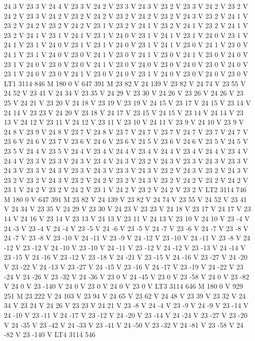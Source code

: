 24 3 V 23 3 V 24 4 V 23 3 V 24 2 V 23 3 V 24 3 V 23 2 V 23 3 V 24 2
V 23 2 V 24 2 V 23 3 V 24 2 V 23 2 V 24 2 V 23 2 V 24 2 V 23 2 V 24
3 V 23 2 V 24 1 V 23 2 V 24 2 V 23 2 V 24 2 V 23 1 V 23 2 V 24 1 V
23 2 V 24 1 V 23 2 V 24 1 V 23 2 V 24 1 V 23 1 V 24 1 V 23 1 V 24 0
V 23 1 V 24 1 V 23 1 V 24 0 V 23 1 V 24 1 V 23 1 V 24 0 V 23 1 V 23
1 V 24 0 V 23 1 V 24 1 V 23 0 V 24 1 V 23 0 V 24 1 V 23 1 V 24 0 V
23 0 V 24 1 V 23 0 V 24 1 V 23 0 V 24 1 V 23 0 V 24 0 V 23 1 V 24 0
V 23 0 V 23 0 V 24 1 V 23 0 V 24 0 V 23 0 V 24 0 V 23 0 V 24 0 V 23
1 V 24 0 V 23 0 V 24 1 V 23 0 V 24 0 V 23 1 V 24 0 V 23 0 V 24 0 V
23 0 V LT1 3114 846 M 180 0 V 647 391 M 23 82 V 24 139 V 23 82 V 24
74 V 23 55 V 24 52 V 23 41 V 24 34 V 23 35 V 24 29 V 23 30 V 24 26
V 23 26 V 24 26 V 23 25 V 24 21 V 23 20 V 24 18 V 23 19 V 23 19 V 24
15 V 23 17 V 24 15 V 23 14 V 24 14 V 23 23 V 24 20 V 23 18 V 24 17
V 23 15 V 24 15 V 23 14 V 24 14 V 23 13 V 24 12 V 23 11 V 24 12 V 23
11 V 23 10 V 24 11 V 23 9 V 24 10 V 23 9 V 24 8 V 23 9 V 24 8 V 23
7 V 24 8 V 23 7 V 24 7 V 23 7 V 24 7 V 23 7 V 24 7 V 23 6 V 24 6 V
23 7 V 23 6 V 24 6 V 23 6 V 24 5 V 23 6 V 24 6 V 23 5 V 24 5 V 23 5
V 24 4 V 23 5 V 24 4 V 23 4 V 24 4 V 23 4 V 24 4 V 23 4 V 24 4 V 23
4 V 24 4 V 23 3 V 23 3 V 24 3 V 23 4 V 24 3 V 23 2 V 24 3 V 23 3 V
24 3 V 23 3 V 24 3 V 23 3 V 24 3 V 23 3 V 24 3 V 23 3 V 24 3 V 23 2
V 24 3 V 23 2 V 24 3 V 23 2 V 23 2 V 24 3 V 23 2 V 24 2 V 23 2 V 24
3 V 23 2 V 24 2 V 23 2 V 24 2 V 23 1 V 24 2 V 23 2 V 24 2 V 23 1 V
24 2 V 23 2 V 24 2 V 23 2 V LT2 3114 746 M 180 0 V 647 391 M 23 82
V 24 139 V 23 82 V 24 74 V 23 55 V 24 52 V 23 41 V 24 34 V 23 35 V
24 29 V 23 30 V 24 23 V 23 23 V 24 18 V 23 17 V 24 17 V 23 14 V 24
16 V 23 14 V 23 13 V 24 13 V 23 11 V 24 13 V 23 10 V 24 10 V 23 -4
V 24 -3 V 23 -4 V 24 -4 V 23 -5 V 24 -6 V 23 -5 V 24 -7 V 23 -6 V 24
-7 V 23 -8 V 24 -7 V 23 -8 V 23 -10 V 24 -11 V 23 -9 V 24 -12 V 23
-10 V 24 -11 V 23 -8 V 24 -12 V 23 -12 V 24 -10 V 23 -10 V 24 -11 V
23 -12 V 24 -12 V 23 -13 V 24 -14 V 23 -15 V 24 -16 V 23 -12 V 23 -18
V 24 -21 V 23 -15 V 24 -16 V 23 -27 V 24 -20 V 23 -22 V 24 -13 V 23
-27 V 24 -15 V 23 -16 V 24 -17 V 23 -19 V 24 -22 V 23 -24 V 24 -26
V 23 -32 V 24 -36 V 23 0 V 24 -45 V 23 0 V 23 -58 V 24 0 V 23 -82 V
24 0 V 23 -140 V 24 0 V 23 0 V 24 0 V 23 0 V LT3 3114 646 M 180 0 V
929 251 M 23 222 V 24 103 V 23 94 V 24 65 V 23 62 V 24 48 V 23 39 V
23 32 V 24 34 V 23 24 V 24 26 V 23 23 V 24 21 V 23 -8 V 24 -4 V 23
-9 V 24 -9 V 23 -14 V 24 -10 V 23 -11 V 24 -17 V 23 -12 V 24 -20 V
23 -14 V 24 -24 V 23 -27 V 23 -20 V 24 -35 V 23 -42 V 24 -33 V 23 -41
V 24 -50 V 23 -32 V 24 -81 V 23 -58 V 24 -82 V 23 -140 V LT4 3114 546
